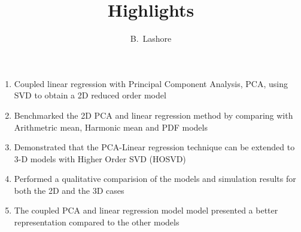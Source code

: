 \documentclass[a4paper,11pt]{article}
\author{B.~Lashore}
\title{Highlights}
\begin{document}
\maketitle

\begin{enumerate}
  \item Coupled linear regression with Principal Component Analysis, PCA, using SVD to obtain a 2D reduced order model
  \item Benchmarked the 2D PCA and linear regression method by comparing with Arithmetric mean, Harmonic mean and PDF models
  \item Demonstrated that the PCA-Linear regression technique can be extended to 3-D models with Higher Order SVD (HOSVD)
  \item Performed a qualitative comparision of the models and simulation results for both the 2D and the 3D cases
  \item The coupled PCA and linear regression model model presented a better representation compared to the other models
\end{enumerate}
\end{document}

